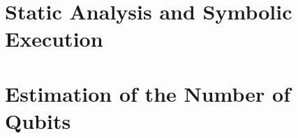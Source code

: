 \documentclass[12pt,a4paper]{report}
\theoremstyle{definition}
\theoremstyle{definition}
\theoremstyle{definition}
\begin{document}
\chapter{Static Analysis and Symbolic Execution}
\chapter{Estimation of the Number of Qubits}
\end{document}
